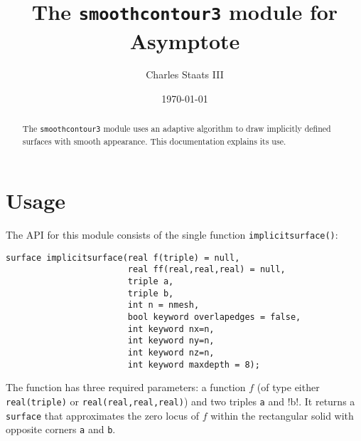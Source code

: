 \documentclass{article}
\title{The \texttt{smoothcontour3} module for Asymptote}
\author{Charles Staats III}
\date{\today}
\begin{document}
\maketitle
\begin{abstract}
The \lstinline!smoothcontour3! module uses an adaptive algorithm to draw implicitly defined surfaces 
with smooth appearance. This documentation explains its use.
\end{abstract}
\tableofcontents
%
\section{Usage}
%
The API for this module consists of the single function \lstinline!implicitsurface()!:
\begin{lstlisting}
surface implicitsurface(real f(triple) = null, 
                        real ff(real,real,real) = null,
                        triple a, 
                        triple b,
                        int n = nmesh,
                        bool keyword overlapedges = false,
                        int keyword nx=n,
                        int keyword ny=n,
                        int keyword nz=n,
                        int keyword maxdepth = 8);
\end{lstlisting}
The function has three required\footnotemark{} 
parameters: a function $f$ (of type either 
\lstinline!real(triple)! or \lstinline!real(real,real,real)!) and two triples 
\lstinline!a! and !b!. It returns a \lstinline!surface! that 
approximates the zero locus of $f$ within the rectangular solid 
with opposite corners \lstinline!a! and \lstinline!b!.
%
\end{document}
